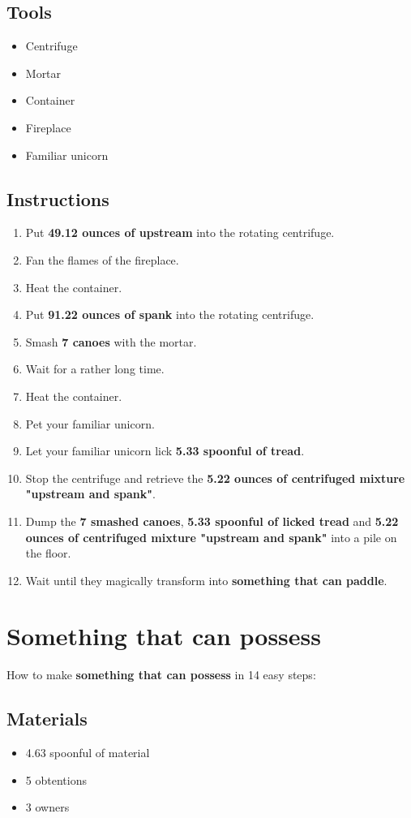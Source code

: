 \documentclass{article}
\begin{document}
\subsection{Tools}\begin{itemize}
\item 
Centrifuge
\item 
Mortar
\item 
Container
\item 
Fireplace
\item 
Familiar unicorn
\end{itemize}
\subsection{Instructions}\begin{enumerate}
\item 
Put \textbf{49.12 ounces of upstream} into the rotating centrifuge.
\item 
Fan the flames of the fireplace.
\item 
Heat the container.
\item 
Put \textbf{91.22 ounces of spank} into the rotating centrifuge.
\item 
Smash \textbf{7 canoes} with the mortar.
\item 
Wait for a rather long time.
\item 
Heat the container.
\item 
Pet your familiar unicorn.
\item 
Let your familiar unicorn lick \textbf{5.33 spoonful of tread}.
\item 
Stop the centrifuge and retrieve the \textbf{5.22 ounces of centrifuged mixture "upstream and spank"}.
\item 
Dump the \textbf{7 smashed canoes}, \textbf{5.33 spoonful of licked tread} and \textbf{5.22 ounces of centrifuged mixture "upstream and spank"} into a pile on the floor.
\item 
Wait until they magically transform into \textbf{something that can paddle}.
\end{enumerate}
\newpage
\section{Something that can possess}How to make \textbf{something that can possess} in 14 easy steps:

\subsection{Materials}\begin{itemize}
\item 
4.63 spoonful of material
\item 
5 obtentions
\item 
3 owners
\end{itemize}
\end{document}
